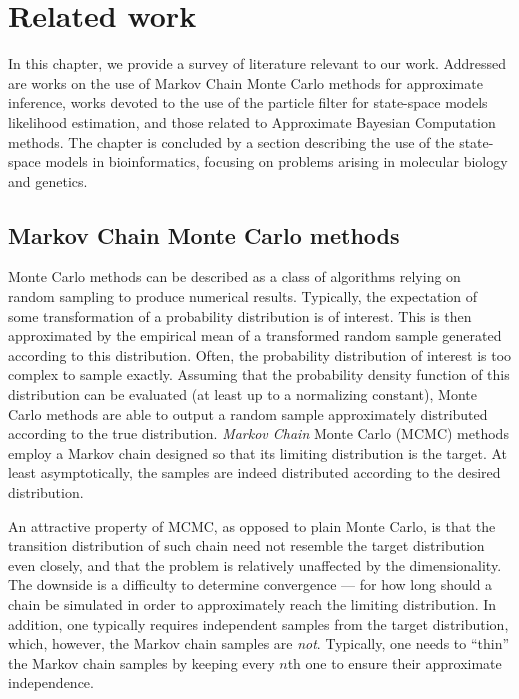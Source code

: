 \chapter{Related work}
\label{chap:related-work}

In this chapter, we provide a survey of literature relevant to our work. Addressed are works on the use of Markov Chain Monte Carlo methods for approximate inference, works devoted to the use of the particle filter for state-space models likelihood estimation, and those related to Approximate Bayesian Computation methods. The chapter is concluded by a section describing the use of the state-space models in bioinformatics, focusing on problems arising in molecular biology and genetics.

\section{Markov Chain Monte Carlo methods}
Monte Carlo methods can be described as a class of algorithms relying on random sampling to produce numerical results. Typically, the expectation of some transformation of a probability distribution is of interest. This is then approximated by the empirical mean of a transformed random sample generated according to this distribution. Often, the probability distribution of interest is too complex to sample exactly. Assuming that the probability density function of this distribution can be evaluated (at least up to a normalizing constant), Monte Carlo methods are able to output a random sample approximately distributed according to the true distribution. \emph{Markov Chain} Monte Carlo (MCMC) methods employ a Markov chain designed so that its limiting distribution is the target. At least asymptotically, the samples are indeed distributed according to the desired distribution.

An attractive property of MCMC, as opposed to plain Monte Carlo, is that the transition distribution of such chain need not resemble the target distribution even closely, and that the problem is relatively unaffected by the dimensionality. The downside is a difficulty to determine convergence --- for how long should a chain be simulated in order to approximately reach the limiting distribution. In addition, one typically requires independent samples from the target distribution, which, however, the Markov chain samples are \emph{not}. Typically, one needs to ``thin'' the Markov chain samples by keeping every $n$th one to ensure their approximate independence.

